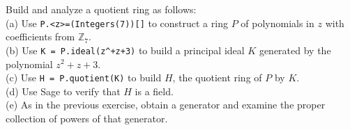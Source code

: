 Build and analyze a quotient ring as follows:\\
(a) Use \verb?P.<z>=(Integers(7))[]? to construct a ring $P$ of polynomials in $z$ with coefficients from ${\mathbb Z}_7$.\\
(b) Use \verb?K = P.ideal(z^+z+3)? to build a principal ideal $K$ generated by the polynomial $z^2+z+3$.\\
(c) Use \verb?H = P.quotient(K)? to build $H$, the quotient ring of $P$ by $K$.\\
(d) Use Sage to verify that $H$ is a field. \\
(e) As in the previous exercise, obtain a generator and examine the proper collection of powers of that generator.
\begin{sageverbatim}\end{sageverbatim}
